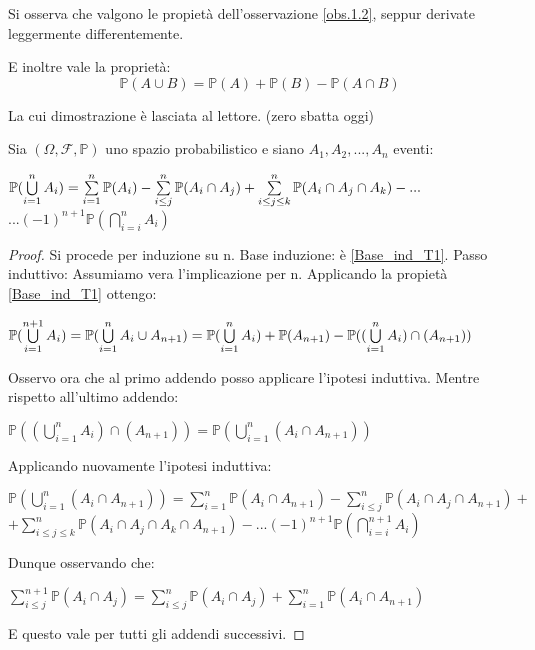 Si osserva che valgono le propietà dell'osservazione \ref{obs.1.2}, seppur derivate leggermente differentemente.
\vspace{5px}

E inoltre vale la proprietà: 
\begin{equation}
    \mathbb{P}(A\cup B)=\mathbb{P}(A)+\mathbb{P}(B)-\mathbb{P}(A\cap B)
    \label{Base_ind_T1}
\end{equation} 


La cui dimostrazione è lasciata al lettore. (zero sbatta oggi)

\vspace{10px}
\begin{theorem}
Sia $(\Omega,\mathscr{F},\mathbb{P})$ uno spazio \newline probabilistico e siano $A_1,A_2,...,A_n$ eventi:
\begin{center}
    $\mathbb{P}(\bigcup\limits\limits_{i=1}^n A_i)= \sum\limits_{i=1}^n \mathbb{P}(A_i) - \sum\limits_{i\leq j}^n\mathbb{P}(A_i\cap A_j) + \sum\limits_{i\leq j\leq k}^n\mathbb{P}(A_i\cap A_j\cap A_k) - ...$
    \newline
    $... (-1)^{n+1}\mathbb{P}(\bigcap\limits_{i=i}^nA_i)$
\end{center}
\newpage
\begin{proof}
Si procede per induzione su n.
\newline
Base induzione: è \ref{Base_ind_T1}.
\newline
Passo induttivo: Assumiamo vera l'implicazione per n. Applicando la propietà \ref{Base_ind_T1} ottengo:
\begin{center}
            $\mathbb{P}(\bigcup\limits\limits_{i=1}^{n+1} A_i)=\mathbb{P}(\bigcup\limits\limits_{i=1}^n A_i \cup A_{n+1})=\mathbb{P}(\bigcup\limits_{i=1}^nA_i)+\mathbb{P}(A_{n+1})-\mathbb{P}((\bigcup\limits_{i=1}^n A_i) \cap (A_{n+1}))$
\end{center}
\label{T1_EQ_1}
Osservo ora che al primo addendo posso applicare l'ipotesi induttiva. Mentre rispetto all'ultimo addendo:
\begin{center}
    $\mathbb{P}((\bigcup\limits_{i=1}^n A_i) \cap (A_{n+1}))=\mathbb{P}(\bigcup\limits_{i=1}^n (A_i \cap A_{n+1}))$
\end{center}
Applicando nuovamente l'ipotesi induttiva:
\begin{center}
    $\mathbb{P}(\bigcup\limits_{i=1}^n (A_i \cap A_{n+1}))=\sum\limits_{i=1}^n \mathbb{P}(A_i\cap A_{n+1}) - \sum\limits_{i\leq j}^n\mathbb{P}(A_i\cap A_j\cap A_{n+1}) +$
    \newline
    $+ \sum\limits_{i\leq j\leq k}^n\mathbb{P}(A_i\cap A_j\cap A_k\cap A_{n+1}) - ...  (-1)^{n+1}\mathbb{P}(\bigcap\limits_{i=i}^{n+1}A_i)$
\end{center}
Dunque osservando che:
\begin{center}
    $\sum\limits_{i\leq j}^{n+1}\mathbb{P}(A_i\cap A_j)=\sum\limits_{i\leq j}^n\mathbb{P}(A_i\cap A_j)+\sum\limits_{i=1}^n\mathbb{P}(A_i\cap A_{n+1})$
\end{center}
E questo vale per tutti gli addendi successivi.


\end{proof}
\end{theorem}
